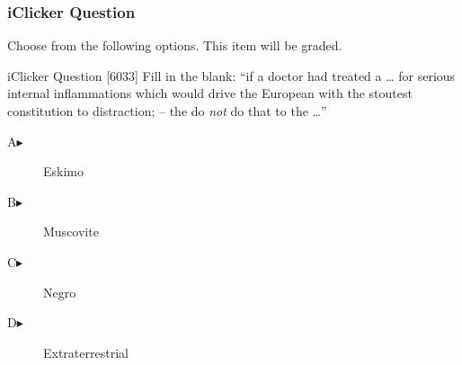 \begin{frame}
  \frametitle{iClicker Question}
Choose from the following options. This item will be graded.
\begin{block}{iClicker Question}
[6033] Fill in the blank: ``if a doctor had treated a {\ldots} for serious internal inflammations which would drive the European with the stoutest constitution to distraction; -- the do \emph{not} do that to the {\ldots}''
\end{block}
\begin{description}
\item[A\hspace{.2in}$\blacktriangleright$] Eskimo
\item[B\hspace{.2in}$\blacktriangleright$] Muscovite
\item[C\hspace{.2in}$\blacktriangleright$] Negro
\item[D\hspace{.2in}$\blacktriangleright$] Extraterrestrial
\end{description}
\end{frame}